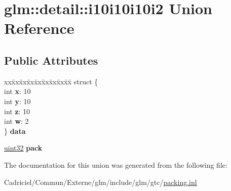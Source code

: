 \hypertarget{unionglm_1_1detail_1_1i10i10i10i2}{}\section{glm\+:\+:detail\+:\+:i10i10i10i2 Union Reference}
\label{unionglm_1_1detail_1_1i10i10i10i2}
\subsection*{Public Attributes}
\begin{DoxyCompactItemize}
\item 
\begin{tabbing}
xx\=xx\=xx\=xx\=xx\=xx\=xx\=xx\=xx\=\kill
struct \{\\
\>int {\bfseries x}: 10\\
\>int {\bfseries y}: 10\\
\>int {\bfseries z}: 10\\
\>int {\bfseries w}: 2\\
\} {\bfseries data}\hypertarget{unionglm_1_1detail_1_1i10i10i10i2_ab4c1d4602d19f6bdfdf850ff892cd0c7}{}\label{unionglm_1_1detail_1_1i10i10i10i2_ab4c1d4602d19f6bdfdf850ff892cd0c7}
\\

\end{tabbing}\item 
\hyperlink{group__gtc__type__precision_ga202b6a53c105fcb7e531f9b443518451}{uint32} {\bfseries pack}\hypertarget{unionglm_1_1detail_1_1i10i10i10i2_a24e2dc324c86589d568dc330904c859a}{}\label{unionglm_1_1detail_1_1i10i10i10i2_a24e2dc324c86589d568dc330904c859a}

\end{DoxyCompactItemize}


The documentation for this union was generated from the following file\+:\begin{DoxyCompactItemize}
\item 
Cadriciel/\+Commun/\+Externe/glm/include/glm/gtc/\hyperlink{packing_8inl}{packing.\+inl}\end{DoxyCompactItemize}
